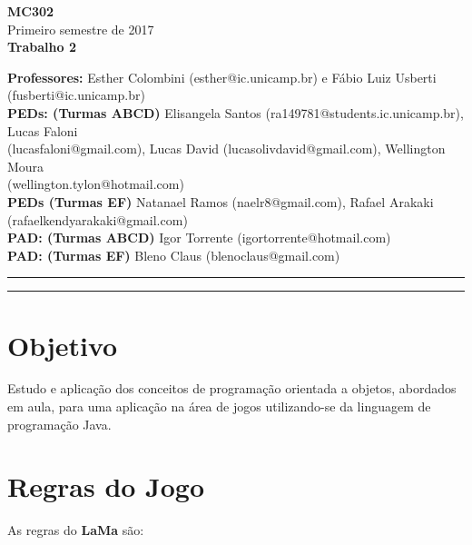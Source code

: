 \documentclass[10pt]{article}
\begin{document}

\begin{large}
	\begin{center}
		\textbf{MC302} \\
		Primeiro semestre de 2017 \\ \vspace{0.5cm}
		\textbf{Trabalho 2}
	\end{center}
\end{large}
\vspace{0.25cm}
\noindent \textbf{Professores:} Esther Colombini (esther@ic.unicamp.br) e Fábio Luiz Usberti (fusberti@ic.unicamp.br) \\
\textbf{PEDs: (Turmas ABCD)} Elisangela Santos (ra149781@students.ic.unicamp.br), Lucas Faloni\\ (lucasfaloni@gmail.com), Lucas David (lucasolivdavid@gmail.com), Wellington Moura\\ (wellington.tylon@hotmail.com) \\
\textbf{PEDs (Turmas EF)} Natanael Ramos (naelr8@gmail.com), Rafael Arakaki (rafaelkendyarakaki@gmail.com) \\
\textbf{PAD: (Turmas ABCD)} Igor Torrente (igortorrente@hotmail.com) \\
\textbf{PAD: (Turmas EF)} Bleno Claus (blenoclaus@gmail.com) \\

\hrule \hrule

\section{Objetivo}

Estudo e aplicação dos conceitos de programação orientada a objetos, abordados em aula, para uma aplicação na área de jogos utilizando-se da linguagem de programação Java.


\section{Regras do Jogo}

As regras do \textbf{LaMa} são:
\end{document}
